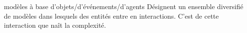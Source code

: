 \documentclass[newPxFont]{beamer}
\begin{document}
\begin{frame}[c]{modèles à base d’objets/d’événements/d’agents}
  \vspace{-2em}
  Désignent un ensemble diversifié de modèles dans lesquels des entités entre en interactions. C'est de cette interaction que naît la complexité.
  \begin{figure}
   	\centering
   		\hspace{0.2em} %
      \hspace{0.2em} %
  \end{figure}

\end{frame}
\end{document}
